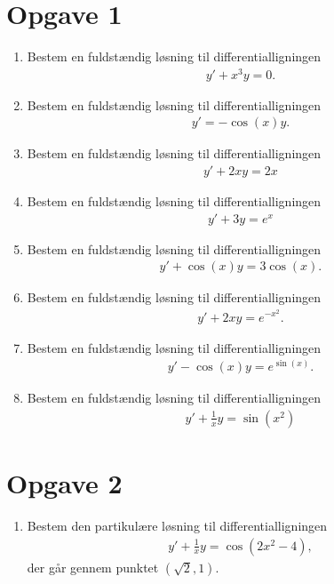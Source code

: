 \section*{Opgave 1}
\begin{enumerate}[label=\roman*)]
	\item Bestem en fuldstændig løsning til differentialligningen
	\begin{align*}
		y' + x^3y = 0.
	\end{align*}
	\item Bestem en fuldstændig løsning til differentialligningen
	\begin{align*}
		y'  = -\cos(x)y.
	\end{align*}
	\item Bestem en fuldstændig løsning til differentialligningen 
	\begin{align*}
		y' + 2xy = 2x
	\end{align*}
	\item Bestem en fuldstændig løsning til differentialligningen
	\begin{align*}
		y' + 3y = e^x
	\end{align*}
	\item Bestem en fuldstændig løsning til differentialligningen
	\begin{align*}
		y' + \cos(x)y = 3\cos(x).
	\end{align*}
	\item Bestem en fuldstændig løsning til differentialligningen
	\begin{align*}
		y' + 2xy = e^{-x^2}.
	\end{align*}
	\item Bestem en fuldstændig løsning til differentialligningen
	\begin{align*}
		y' - \cos(x)y = e^{\sin(x)}.
	\end{align*}
	\item Bestem en fuldstændig løsning til differentialligningen
	\begin{align*}
		y' + \frac{1}{x}y = \sin(x^2)
	\end{align*}
\end{enumerate}

\section*{Opgave 2}
\begin{enumerate}[label=\roman*)]
	\item Bestem den partikulære løsning til differentialligningen 
	\begin{align*}
		y' + \frac{1}{x}y = \cos(2x^2-4),
	\end{align*}
	der går gennem punktet $(\sqrt{2},1)$.
\end{enumerate}